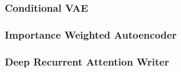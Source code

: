 \subsubsection{Conditional VAE \cite{cvae:2015}}
\label{ssub:vae_conditional_vae}


\newpage

\subsubsection{Importance Weighted Autoencoder \cite{iwae:2015}}
\label{ssub:vae_importance_weighted_autoencoder}


\subsubsection{Deep Recurrent Attention Writer \cite{draw:2015}}
\label{ssub:vae_deep_recurrent_attention_writer}


\newpage
